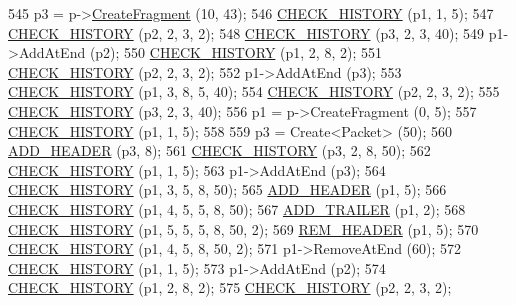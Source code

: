 \begin{DoxyCode}
545   p3 = p->\hyperlink{classns3_1_1Packet_a16f6113606b355b2b346e2245fa2a3d0}{CreateFragment} (10, 43);
546   \hyperlink{packet-metadata-test_8cc_a15a730e778d9d498a39e778bcd39684c}{CHECK\_HISTORY} (p1, 1, 5);
547   \hyperlink{packet-metadata-test_8cc_a15a730e778d9d498a39e778bcd39684c}{CHECK\_HISTORY} (p2, 2, 3, 2);
548   \hyperlink{packet-metadata-test_8cc_a15a730e778d9d498a39e778bcd39684c}{CHECK\_HISTORY} (p3, 2, 3, 40);
549   p1->AddAtEnd (p2);
550   \hyperlink{packet-metadata-test_8cc_a15a730e778d9d498a39e778bcd39684c}{CHECK\_HISTORY} (p1, 2, 8, 2);
551   \hyperlink{packet-metadata-test_8cc_a15a730e778d9d498a39e778bcd39684c}{CHECK\_HISTORY} (p2, 2, 3, 2);
552   p1->AddAtEnd (p3);
553   \hyperlink{packet-metadata-test_8cc_a15a730e778d9d498a39e778bcd39684c}{CHECK\_HISTORY} (p1, 3, 8, 5, 40);
554   \hyperlink{packet-metadata-test_8cc_a15a730e778d9d498a39e778bcd39684c}{CHECK\_HISTORY} (p2, 2, 3, 2);
555   \hyperlink{packet-metadata-test_8cc_a15a730e778d9d498a39e778bcd39684c}{CHECK\_HISTORY} (p3, 2, 3, 40);
556   p1 = p->CreateFragment (0, 5);
557   \hyperlink{packet-metadata-test_8cc_a15a730e778d9d498a39e778bcd39684c}{CHECK\_HISTORY} (p1, 1, 5);
558 
559   p3 = Create<Packet> (50);
560   \hyperlink{packet-metadata-test_8cc_a120012d48d29d678b3138d5c7b9bf714}{ADD\_HEADER} (p3, 8);
561   \hyperlink{packet-metadata-test_8cc_a15a730e778d9d498a39e778bcd39684c}{CHECK\_HISTORY} (p3, 2, 8, 50);
562   \hyperlink{packet-metadata-test_8cc_a15a730e778d9d498a39e778bcd39684c}{CHECK\_HISTORY} (p1, 1, 5);
563   p1->AddAtEnd (p3);
564   \hyperlink{packet-metadata-test_8cc_a15a730e778d9d498a39e778bcd39684c}{CHECK\_HISTORY} (p1, 3, 5, 8, 50);
565   \hyperlink{packet-metadata-test_8cc_a120012d48d29d678b3138d5c7b9bf714}{ADD\_HEADER} (p1, 5);
566   \hyperlink{packet-metadata-test_8cc_a15a730e778d9d498a39e778bcd39684c}{CHECK\_HISTORY} (p1, 4, 5, 5, 8, 50);
567   \hyperlink{packet-metadata-test_8cc_ab10bc130bb7184d47509ea44f4fb24df}{ADD\_TRAILER} (p1, 2);
568   \hyperlink{packet-metadata-test_8cc_a15a730e778d9d498a39e778bcd39684c}{CHECK\_HISTORY} (p1, 5, 5, 5, 8, 50, 2);
569   \hyperlink{packet-metadata-test_8cc_a8694c61c9ba33c72896dde3628538a84}{REM\_HEADER} (p1, 5);
570   \hyperlink{packet-metadata-test_8cc_a15a730e778d9d498a39e778bcd39684c}{CHECK\_HISTORY} (p1, 4, 5, 8, 50, 2);
571   p1->RemoveAtEnd (60);
572   \hyperlink{packet-metadata-test_8cc_a15a730e778d9d498a39e778bcd39684c}{CHECK\_HISTORY} (p1, 1, 5);
573   p1->AddAtEnd (p2);
574   \hyperlink{packet-metadata-test_8cc_a15a730e778d9d498a39e778bcd39684c}{CHECK\_HISTORY} (p1, 2, 8, 2);
575   \hyperlink{packet-metadata-test_8cc_a15a730e778d9d498a39e778bcd39684c}{CHECK\_HISTORY} (p2, 2, 3, 2);

\end{DoxyCode}
